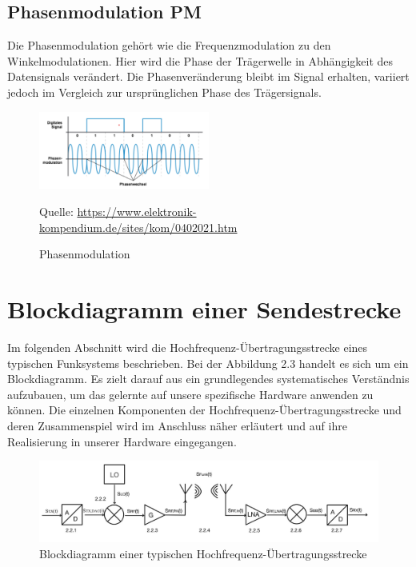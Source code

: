\subsection{Phasenmodulation PM}
Die Phasenmodulation gehört wie die Frequenzmodulation zu den Winkelmodulationen.
Hier wird die Phase der Trägerwelle in Abhängigkeit des Datensignals verändert.
Die Phasenveränderung bleibt im Signal erhalten, variiert jedoch im Vergleich
zur ursprünglichen Phase des Trägersignals.
\begin{figure}[h]
    \centering
    \includegraphics[width=0.5\textwidth]{Pictures/04020211.png}
    \caption{Phasenmodulation}
    \footnotesize{Quelle: \url{https://www.elektronik-kompendium.de/sites/kom/0402021.htm}}
\end{figure}

\section{Blockdiagramm einer Sendestrecke}
Im folgenden Abschnitt wird die Hochfrequenz-Übertragungsstrecke eines typischen Funksystems beschrieben. Bei der Abbildung 2.3 handelt es sich um ein Blockdiagramm. Es zielt darauf aus ein grundlegendes
systematisches Verständnis aufzubauen, um das gelernte auf unsere spezifische Hardware anwenden zu können. Die einzelnen Komponenten der Hochfrequenz-Übertragungsstrecke
und deren Zusammenspiel wird im Anschluss näher erläutert und auf ihre Realisierung in unserer Hardware eingegangen.\\

\begin{figure}[h]
    \centering
    \includegraphics[width=1\textwidth]{Pictures/Blockdiagramm.jpg}   
    \caption{Blockdiagramm einer typischen Hochfrequenz-Übertragungsstrecke}
\end{figure}
\clearpage

